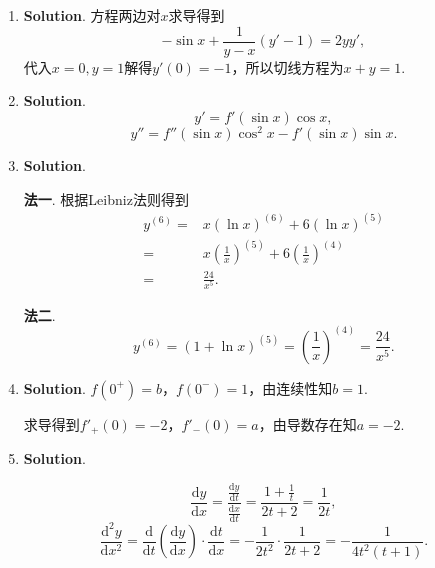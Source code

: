 \documentclass[../main.tex]{subfiles}
\begin{document}
\begin{enumerate}
    \item \textbf{Solution}. 方程两边对$x$求导得到
          \[
              -\sin x+\frac{1}{y-x}(y'-1)=2yy',
          \]
          代入$x=0,y=1$解得$y'(0)=-1$，所以切线方程为$x+y=1$.

    \item \textbf{Solution}.
          \[
              y'=f'(\sin x)\cos x,
          \]
          \[
              y''=f''(\sin x)\cos^{2} x-f'(\sin x)\sin x.
          \]

    \item \textbf{Solution}.

          \textbf{法一}. 根据Leibniz法则得到
          \[
              \begin{aligned}
                  y^{(6)}= {} & x\left(\ln x\right)^{(6)}+6\left(\ln x\right)^{(5)}             \\
                  = {}        & x\left(\frac{1}{x}\right)^{(5)}+6\left(\frac{1}{x}\right)^{(4)} \\
                  = {}        & \frac{24}{x^5}.
              \end{aligned}
          \]

          \textbf{法二}.
          \[
              y^{(6)}=\left(1+\ln x\right)^{(5)}=\left(\frac{1}{x}\right)^{(4)}=\frac{24}{x^{5}}
              .
          \]

    \item \textbf{Solution}. $f\left(0^{+}\right)=b$，$f\left(0^{-}\right
              )=1$，由连续性知$b=1$.

          求导得到$f'_{+}(0)=-2$，$f'_{-}(0)=a$，由导数存在知$a=-2$.

    \item \textbf{Solution}.

          \[
              \frac{\mathrm{d}y}{\mathrm{d}x}=\frac{\frac{\mathrm{d}y}{\mathrm{d}t}}{\frac{\mathrm{d}x}{\mathrm{d}t}}
              =\frac{1+\frac{1}{t}}{2t+2}=\frac{1}{2t},
          \]
          \[
              \frac{\mathrm{d}^{2} y}{\mathrm{d}x^{2}}=\frac{\mathrm{d}}{\mathrm{d}t}\left
              (\frac{\mathrm{d}y}{\mathrm{d}x}\right)\cdot\frac{\mathrm{d}t}{\mathrm{d}x}
              =-\frac{1}{2t^{2}}\cdot\frac{1}{2t+2}=-\frac{1}{4t^{2}(t+1)}.
          \]
\end{enumerate}
\end{document}
